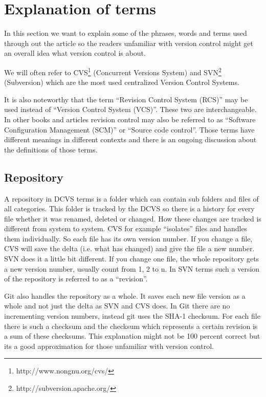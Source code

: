 \section{Explanation of terms}\label{explanationofterms}

In this section we want to explain some of the phrases, words and terms used through out the article so the 
readers unfamiliar with version control might get an overall idea what version control is about.

We will often refer to CVS\footnote{http://www.nongnu.org/cvs/} (Concurrent Versions System) and SVN\footnote{http://subversion.apache.org/} (Subversion) which are the most used centralized Version Control Systems.

It is also noteworthy that the term “Revision Control System (RCS)” may be used instead of “Version Control System (VCS)”. These two are interchangeable. In other books and articles revision control may also be referred to as “Software Configuration Management (SCM)” or “Source code control”. Those terms have different meanings in different contexts and there is an ongoing discussion about the definitions of those terms.

\subsection{Repository}

A repository in DCVS terms is a folder which can contain sub folders and files of all categories. 
This folder is tracked by the DCVS so there is a history for every file whether it was renamed, deleted or changed. 
How these changes are tracked is different from system to system. CVS for example “isolates” 
files and handles them individually. So each file has its own version number. If you change a file, CVS will 
save the delta (i.e. what has changed) and give the file a new number. SVN does it a little bit 
different. If you change one file, the whole repository gets a new version number, usually count from 1, 2 to n. 
In SVN terms such a version of the repository is referred to as a “revision”.

Git also handles the repository as a whole. It saves each new file version as a whole and not just the delta as SVN and CVS does. 
In Git there are no incrementing version numbers, instead git uses the SHA-1 checksum. For each file there is such a 
checksum and the checksum which represents a certain revision is a sum of these checksums. 
This explanation might not be 100 percent correct but its a good approximation for those unfamiliar with version control.


